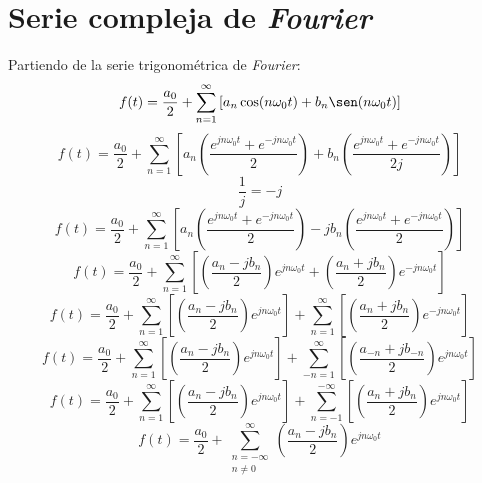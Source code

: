 \section{Serie compleja de \emph{Fourier}}
Partiendo de la serie trigonométrica de \emph{Fourier}:
\begin{equation*}
    f(t)=\frac{a_0}{2}+
    \sum_{n=1}^{\infty}\left[
        a_n\cos(n\omega_0 t)+
        b_n\sen(n\omega_0 t)
    \right]
\end{equation*}
\begin{equation*}
    f(t)=\frac{a_0}{2}+
    \sum_{n=1}^{\infty}\left[
        a_n\left(
            \frac{e^{jn\omega_0 t}+e^{-jn\omega_0 t}
            }{2}
        \right)+
        b_n\left(
            \frac{e^{jn\omega_0 t}+e^{-jn\omega_0 t}
            }{2j}
        \right)
    \right]
\end{equation*}
\begin{equation*}
    \frac{1}{j}=-j
\end{equation*}
\begin{equation*}
    f(t)=\frac{a_0}{2}+
    \sum_{n=1}^{\infty}\left[
        a_n\left(
            \frac{e^{jn\omega_0 t}+e^{-jn\omega_0 t}
            }{2}
        \right)-
        jb_n\left(
            \frac{e^{jn\omega_0 t}+e^{-jn\omega_0 t}
            }{2}
        \right)
    \right]
\end{equation*}
\begin{equation*}
    f(t)=\frac{a_0}{2}+
    \sum_{n=1}^{\infty}\left[
        \left(\frac{a_n-jb_n}{2}\right)e^{jn\omega_0 t}+
        \left(\frac{a_n+jb_n}{2}\right)e^{-jn\omega_0 t}
    \right]
\end{equation*}
\begin{equation*}
    f(t)=\frac{a_0}{2}+
    \sum_{n=1}^{\infty}\left[
        \left(\frac{a_n-jb_n}{2}\right)e^{jn\omega_0 t}
    \right]+
    \sum_{n=1}^{\infty}\left[
        \left(\frac{a_n+jb_n}{2}\right)e^{-jn\omega_0 t}
    \right]
\end{equation*}
\begin{equation*}
    f(t)=\frac{a_0}{2}+
    \sum_{n=1}^{\infty}\left[
        \left(\frac{a_n-jb_n}{2}\right)e^{jn\omega_0 t}
    \right]+
    \sum_{-n=1}^{\infty}\left[
        \left(\frac{a_{-n}+jb_{-n}}{2}\right)e^{jn\omega_0 t}
    \right]
\end{equation*}
\begin{equation*}
    f(t)=\frac{a_0}{2}+
    \sum_{n=1}^{\infty}\left[
        \left(\frac{a_n-jb_n}{2}\right)e^{jn\omega_0 t}
    \right]+
    \sum_{n=-1}^{-\infty}\left[
        \left(\frac{a_n+jb_n}{2}\right)e^{jn\omega_0 t}
    \right]
\end{equation*}
\begin{equation*}
    f(t)=\frac{a_0}{2}+
    \sum_{\substack{n=-\infty\\n\neq0}}^{\infty}
        \left(\frac{a_n-jb_n}{2}\right)e^{jn\omega_0 t}
\end{equation*}

